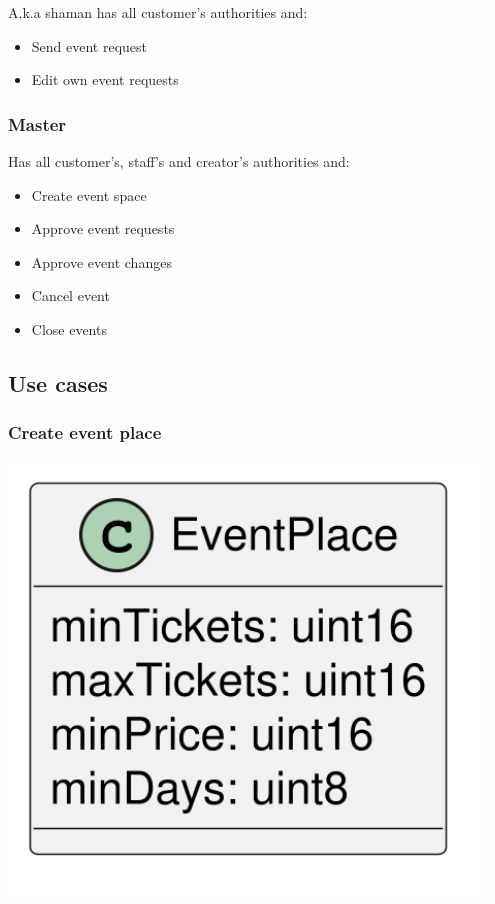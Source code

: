 \documentclass[11pt]{article}
\begin{document}
A.k.a shaman has all customer's authorities and:

\begin{itemize}
\item Send event request
\item Edit own event requests
\end{itemize}
\subsubsection{Master}
\label{sec:orgc7207e0}

Has all customer's, staff's and creator's authorities and:

\begin{itemize}
\item Create event space
\item Approve event requests
\item Approve event changes
\item Cancel event
\item Close events
\end{itemize}
\subsection{Use cases}
\label{sec:org228ebed}

\subsubsection{Create event place}
\label{sec:orgdc0d676}

\begin{center}
\includegraphics[width=0.95\textwidth]{./img/event-place.png}
\label{org11a36d1}
\end{center}
\end{document}
